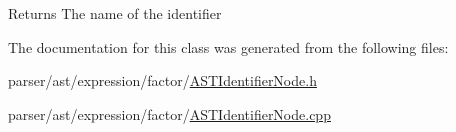 \begin{DoxyReturn}{Returns}
The name of the identifier 
\end{DoxyReturn}


The documentation for this class was generated from the following files\+:\begin{DoxyCompactItemize}
\item 
parser/ast/expression/factor/\hyperlink{ASTIdentifierNode_8h}{A\+S\+T\+Identifier\+Node.\+h}\item 
parser/ast/expression/factor/\hyperlink{ASTIdentifierNode_8cpp}{A\+S\+T\+Identifier\+Node.\+cpp}\end{DoxyCompactItemize}
